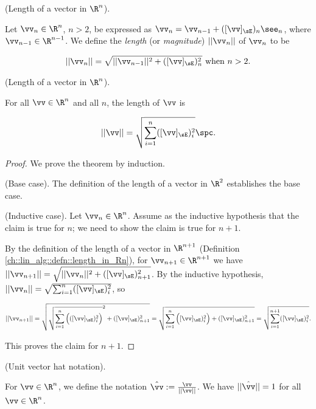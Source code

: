 \begin{defn}
	\label{ch::lin_alg::defn::length_in_Rn}
	(Length of a vector in $\R^n$). 
	
	Let $\vv_n \in \R^n$, $n > 2$, be expressed as $\vv_n = \vv_{n - 1} + ([\vv]_\sE)_n \see_n$, where $\vv_{n - 1} \in \R^{n - 1}$. We define the \textit{length} (or \textit{magnitude}) $||\vv_n||$ of $\vv_n$ to be
	
	\begin{align*}
		||\vv_n|| = \sqrt{||\vv_{n - 1}||^2 + ([\vv]_\sE)_n^2} \text{ when $n > 2$}.
	\end{align*}
\end{defn}

\begin{theorem}
	(Length of a vector in $\R^n$).
	
	For all $\vv \in \R^n$ and all $n$, the length of $\vv$ is
	
	\begin{align*}
		||\vv|| = \sqrt{\sum_{i = 1}^n ([\vv]_\sE)_i^2}\spc.
	\end{align*}
\end{theorem}

\begin{proof}
	We prove the theorem by induction.
	
	(Base case). The definition of the length of a vector in $\R^2$ establishes the base case.
	
	(Inductive case). Let $\vv_n \in \R^n$. Assume as the inductive hypothesis that the claim is true for $n$; we need to show the claim is true for $n + 1$.
	
	By the definition of the length of a vector in $\R^{n + 1}$ (Definition \ref{ch::lin_alg::defn::length_in_Rn}), for $\vv_{n + 1} \in \R^{n + 1}$ we have \\ ${||\vv_{n + 1}|| = \sqrt{||\vv_n||^2 + ([\vv]_\sE)_{n + 1}^2}}$. By the inductive hypothesis, $||\vv_n|| = \sqrt{\sum_{i = 1}^n ([\vv]_\sE)_i^2}$, so
	
	\begin{align*}
		||\vv_{n + 1}|| = \sqrt{\sqrt{\sum_{i = 1}^n \Big(([\vv]_\sE)_i^2\Big)}^2 + ([\vv]_\sE)_{n + 1}^2} = \sqrt{\sum_{i = 1}^n \Big([\vv]_\sE)_i^2\Big) + ([\vv]_\sE)_{n + 1}^2} = \sqrt{\sum_{i = 1}^{n + 1} ([\vv]_\sE)_i^2}.
	\end{align*}
	
	This proves the claim for $n + 1$.
\end{proof}

\begin{defn}
	\label{ch::lin_alg::defn::unit_vector_hat_notation}
	(Unit vector hat notation). 
	
	For $\vv \in \R^n$, we define the notation $\hat{\vv} := \frac{\vv}{||\vv||}$. We have $||\hat{\vv}|| = 1$ for all $\vv \in \R^n$.
\end{defn}

